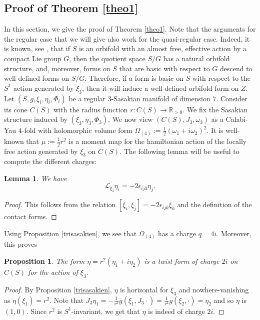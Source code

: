 \documentclass[12pt, reqno]{amsart}
\newtheorem{prop}[Def]{Proposition}
\newtheorem{lemma}[Def]{Lemma}
\theoremstyle{definition}
\newcommand{\R}{\mathbb{R}}
\newcommand{\lied}{\mathcal{L}}
\begin{document}
\subsection{Proof of Theorem \ref{theo1}}\label{3.4} In this section, we give the proof of Theorem \ref{theo1}. Note that the arguments for the regular case that we will give also work for the quasi-regular case. Indeed, it is known, see \cite{caramello2022introductionorbifolds}, that if $S$ is  an orbifold with an almost free, effective action by a compact
Lie group $G$, then  the quotient space 
$S/G$ has a natural orbifold structure, and,  moreover, forms on $S$ that are basic with respect to  $G$ descend to well-defined forms on $S/G$. Therefore, if a form is basic on $S$ with respect to the $S^1$ action generated by $\xi_3$, then it will induce a well-defined orbifold form on $Z$. \\
\indent Let $(S,g,\xi_i,\eta_i,\Phi_i)$ be a regular $3$-Sasakian manifold of dimension $7$. Consider its cone $C(S)$ with the radius function $r : C(S)\to\R_{>0}$. We fix the Sasakian structure induced by $(\xi_3,\eta_3,\Phi_3)$. We now view $(C(S),J_3,\omega_3)$ as a Calabi-Yau $4$-fold with holomorphic volume form $\Omega_{(4)}:=\frac{1}{2}(\omega_1+i\omega_2)^2$. It is well-known that $\mu:=\frac{1}{2}r^2$ is a moment map for the hamiltonian action of the locally free action generated by $\xi_3$ on $C(S)$. The following lemma will be useful to compute the different charges:
\begin{lemma}
    We have
    $$\lied_{\xi_3}\eta_i=-2\epsilon_{ij3}\eta_j.$$
\end{lemma} 
\begin{proof}
    This follows from the relation $[\xi_i,\xi_j]=-2\epsilon_{ijk}\xi_k$ and the definition of the contact forms. 
\end{proof}
Using Proposition \ref{trisasakien}, we see that $\Omega_{(4)}$ has a charge $q=4i$. Moreover, this proves
\begin{prop}
    The form $\eta=r^2(\eta_1+i\eta_2)$ is a twist form of charge $2i$ on $C(S)$ for the action of $\xi_3$.
\end{prop}
\begin{proof}
    By Proposition \ref{trisasakien}, $\eta$ is horizontal for $\xi_3$ and nowhere-vanishing as $\eta(\xi_1)=r^2$. Note that $J_3\eta_1=-\frac{1}{r^2}\overline{g}(\xi_1,J_3\cdot)=\frac{1}{r^2}g(\xi_2,\cdot)=\eta_2$ and so $\eta$ is $(1,0)$. Since $r^2$ is $S^1$-invariant, we get that $\eta$ is indeed of charge $2i$.
\end{proof}
\end{document}

